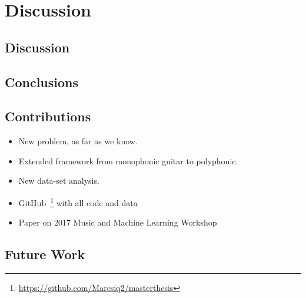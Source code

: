 \chapter{Discussion}
\label{chap:discussion}

\section{Discussion}

\section{Conclusions}

\section{Contributions}
\begin{itemize}[noitemsep]
\item New problem, as far as we know.
\item Extended framework from monophonic guitar to polyphonic.
\item New data-set analysis.
\item GitHub~\footnote{\url{https://github.com/Marcsiq2/masterthesis}} with all code and data
\item Paper on 2017 Music and Machine Learning Workshop
\end{itemize}

\section{Future Work}

\cleardoublepage

